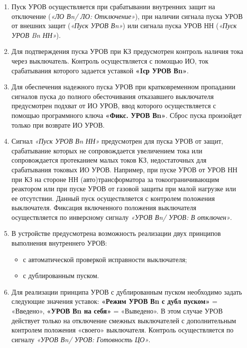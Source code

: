 \begin{enumerate}
\begin{enumerate}
\item
Пуск УРОВ осуществляется при срабатывании внутренних защит на отключение (\textit{«ЛО Вn/ ЛО: Отключение»}), при наличии сигнала пуска УРОВ от внешних защит (\textit{«Пуск УРОВ Вn»}) или сигнала пуска УРОВ НН (\textit{«Пуск УРОВ Bn НН»}).

\item
Для подтверждения пуска УРОВ при КЗ предусмотрен контроль наличия тока через выключатель. Контроль осуществляется с помощью ИО, ток срабатывания которого задается уставкой \textbf{«Iср УРОВ Вn»}.

\item
Для обеспечения надежного пуска УРОВ при кратковременном пропадании сигналов пуска до полного обесточивания отказавшего выключателя предусмотрен подхват от ИО УРОВ, ввод которого осуществляется 
с помощью программного ключа \textbf{«Фикс. УРОВ Вn»}. Сброс пуска произойдет только при возврате ИО УРОВ.

\item
Сигнал \textit{«Пуск УРОВ Вn НН»} предусмотрен для пуска УРОВ от защит, срабатывание которых не сопровождается увеличением тока или сопровождается протеканием малых токов КЗ, недостаточных для срабатывания токовых ИО УРОВ. Например, при пуске УРОВ от УРОВ НН при КЗ на стороне НН (авто)трансформатора за токоограничивающим реактором или при пуске УРОВ от газовой защиты при малой нагрузке или ее отсутствии.
Данный пуск осуществляется с контролем положения выключателя. Фиксация включенного положения выключателя осуществляется по инверсному сигналу \textit{«УРОВ Вn/ УРОВ: В отключен»}.

\item
В устройстве предусмотрена возможность реализации двух принципов выполнения внутреннего УРОВ:
\begin{itemize}
\item с автоматической проверкой исправности выключателя;
\item с дублированным пуском.
\end{itemize}

\item
Для реализации принципа УРОВ с дублированным пуском необходимо задать следующие значения уставок: \textbf{«Режим УРОВ Вn с дубл пуском»} = «Введено», \textbf{«УРОВ Вn на себя»} = «Выведено».
В этом случае УРОВ действует только на отключение смежных выключателей с дополнительным контролем положения «своего» выключателя. Контроль осуществляется по сигналу \textit{«УРОВ Вn/ УРОВ: Готовность ЦО»}.


\end{enumerate}
\end{enumerate}
